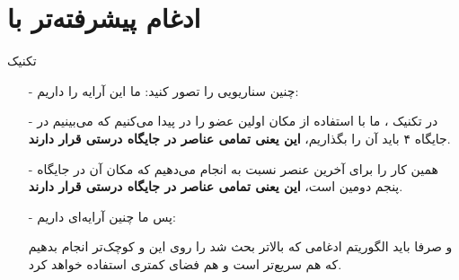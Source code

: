 \section{ادغام پیشرفته‌تر با }
\begin{frame}{تکنیک }
\begin{itemize}\itemr
\item[-]
چنین سناریویی را تصور کنید: ما این آرایه‌ را داریم:

\begin{lfl}
\end{lfl}

\item[-]
در تکنیک ، ما با استفاده از  مکان اولین عضو 
را در 
پیدا می‌کنیم که می‌بینیم در جایگاه ۴ باید آن را بگذاریم، \textbf{این یعنی تمامی عناصر \m{[1, 2, 3]} در جایگاه درستی قرار دارند}.

\item[-]
همین کار را برای آخرین عنصر 
نسبت به 
انجام می‌دهیم که مکان آن در جایگاه پنجم دومین  است، \textbf{این یعنی تمامی عناصر  در جایگاه درستی قرار دارند}.

\item[-]
پس ما چنین آرایه‌ای داریم:
\begin{lfl}
\end{lfl}
و صرفا باید الگوریتم ادغامی که بالاتر بحث شد را روی این 
و 
کوچک‌تر انجام بدهیم که هم سریع‌تر است و هم فضای کمتری استفاده خواهد کرد.
\end{itemize}
\end{frame}
